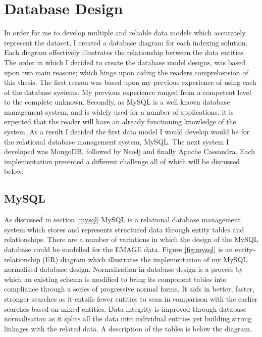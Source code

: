 \section{Database Design}\label{dbdesign}

In order for me to develop multiple and reliable data models which accurately represent the dataset, I created a database diagram for each indexing solution. Each diagram effectively illustrates the relationship between the data entities. The order in which I decided to create the database model designs, was based upon two main reasons; which hinge upon aiding the readers comprehension of this thesis. The first reason was based upon my previous experience of using each of the database systems. My previous experience ranged from a competent level to the complete unknown. Secondly, as MySQL is a well known database management system, and is widely used for a number of applications, it is expected that the reader will have an already functioning knowledge of the system. As a result I decided the first data model I would develop would be for the relational database management system, MySQL. The next system I developed was MongoDB, followed by Neo4j and finally Apache Cassandra. Each implementation presented a different challenge all of which will be discussed below.

\subsection*{MySQL}

As discussed in section \ref{mysql} MySQL is a relational database management system which stores and represents structured data through entity tables and relationships. There are a number of variations in which the design of the MySQL database could be modelled for the EMAGE data. Figure \ref{fig:mysql} is an entity-relationship (ER) diagram which illustrates the implementation of my MySQL normalised database design. Normalisation in database design is a process by which an existing schema is modified to bring its component tables into compliance through a series of progressive normal forms. It aids in better, faster, stronger searches as it entails fewer entities to scan in comparison with the earlier searches based on mixed entities. Data integrity is improved through database normalisation as it splits all the data into individual entities yet building strong linkages with the related data. A description of the tables is below the diagram.

